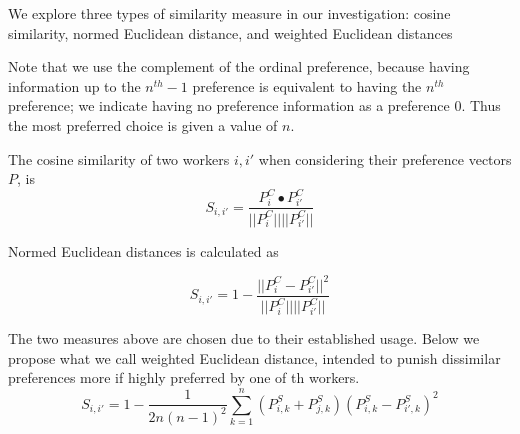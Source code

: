 We explore three types of similarity measure in our investigation: cosine similarity, normed Euclidean distance, and weighted Euclidean distances

Note that we use the complement of the ordinal preference, because having information up to the  $n^{th} - 1$ preference is equivalent to having the $n^{th}$ preference; we indicate having no preference information as a preference 0. Thus the most preferred choice is given a value of $n$. 

The cosine similarity of two workers $i, i'$ when considering their preference vectors $P$, is
\[S_{i, i'} = \frac{P^C_{i} \bullet P^C_{i'}}{||P^C_i|| ||P^C_{i'}||}\]

Normed Euclidean distances is calculated as

\[S_{i, i'} = 1- \frac{||P^C_i - P^C_{i'}||^2}{||P^C_i|| ||P^C_{i'}||}\]

The two measures above are chosen due to their established usage. Below we propose what we call weighted Euclidean distance, intended to punish dissimilar preferences more if highly preferred by one of th workers. 
\[S_{i, i'} = 1 - \frac{ 1}{2n(n-1)^2} \sum_{k=1}^{n} (P^S_{i,k} + P^S_{j,k})(P^S_{i,k} - P^S_{i',k})^2\]